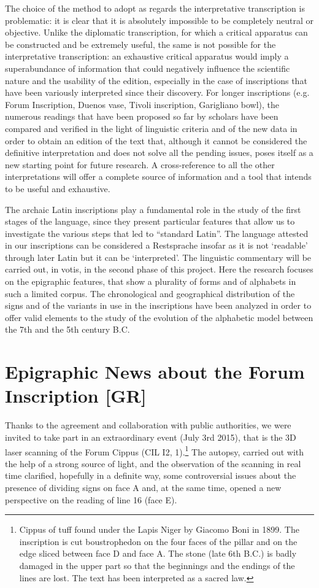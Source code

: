 \documentclass[amsthm,ebook]{saparticle}
\begin{document}
The choice of the method to adopt as regards the interpretative transcription is problematic: it is clear that it is
absolutely impossible to be completely neutral or objective. Unlike the diplomatic transcription, for which a critical
apparatus can be constructed and be extremely useful, the same is not possible for the interpretative transcription: an
exhaustive critical apparatus would imply a superabundance of information that could negatively influence the
scientific nature and the usability of the edition, especially in the case of inscriptions that have been variously
interpreted since their discovery. For longer inscriptions (e.g. Forum Inscription, Duenos vase, Tivoli inscription,
Garigliano bowl), the numerous readings that have been proposed so far by scholars have been compared and verified in
the light of linguistic criteria and of the new data in order to obtain an edition of the text that, although it cannot
be considered the definitive interpretation and does not solve all the pending issues, poses itself as a new starting
point for future research. A cross-reference to all the other interpretations will offer a complete source of
information and a tool that intends to be useful and exhaustive.

The archaic Latin inscriptions play a fundamental role in the study of the first stages of the language, since they
present particular features that allow us to investigate the various steps that led to “standard Latin”. The language
attested in our inscriptions can be considered a Restsprache insofar as it is not `readable' through later Latin
but it can be `interpreted'. The linguistic commentary will be carried out, in votis, in the second phase of this
project. Here the research focuses on the epigraphic features, that show a plurality of forms and of alphabets in such
a limited corpus. The chronological and geographical distribution of the signs and of the variants in use in the
inscriptions have been analyzed in order to offer valid elements to the study of the evolution of the alphabetic model
between the 7th and the 5th century B.C.

\section{Epigraphic News about the Forum Inscription [GR]}


Thanks to the agreement and collaboration with public authorities, we were invited to take part in an extraordinary
event (July 3rd 2015), that is the 3D laser scanning of the Forum Cippus (CIL I2, 1).\footnote{Cippus of tuff found
under the Lapis Niger by Giacomo Boni in 1899. The inscription is cut boustrophedon on the four faces of the pillar and
on the edge sliced between face D and face A. The stone (late 6th B.C.) is badly damaged in the upper part so that the
beginnings and the endings of the lines are lost. The text has been interpreted as a sacred law.} The autopsy, carried
out with the help of a strong source of light, and the observation of the scanning in real time clarified, hopefully in
a definite way, some controversial issues about the presence of dividing signs on face A and, at the same time, opened
a new perspective on the reading of line 16 (face E). 
\end{document}
